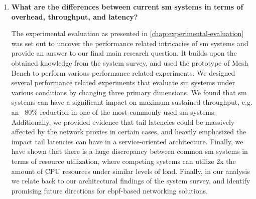 \begin{enumerate}[label=\textbf{RQ\arabic*}, leftmargin=3\parindent]
    \item \textbf{What are the differences between current \gls{sm} systems in terms of overhead, throughput, and latency?}
    \label{rq-3:ans}
    
    The experimental evaluation as presented in \cref{chap:experimental-evaluation} was set out to uncover the performance related intricacies of \gls{sm} systems and provide an answer to our final main research question. It builds upon the obtained knowledge from the system survey, and used the prototype of Mesh Bench to perform various performance related experiments. We designed several performance related experiments that evaluate \gls{sm} systems under various conditions by changing three primary dimensions. We found that \gls{sm} systems can have a significant impact on maximum sustained throughput, e.g. an ~80\% reduction in one of the most commonly used \gls{sm} systems. Additionally, we provided evidence that tail latencies could be massively affected by the network proxies in certain cases, and heavily emphasized the impact tail latencies can have in a service-oriented architecture. Finally, we have shown that there is a huge discrepancy between common \gls{sm} systems in terms of resource utilization, where competing systems can utilize 2x the amount of CPU resources under similar levels of load. Finally, in our analysis we relate back to our architectural findings of the system survey, and identify promising future directions for \gls{ebpf}-based networking solutions.

\end{enumerate}
